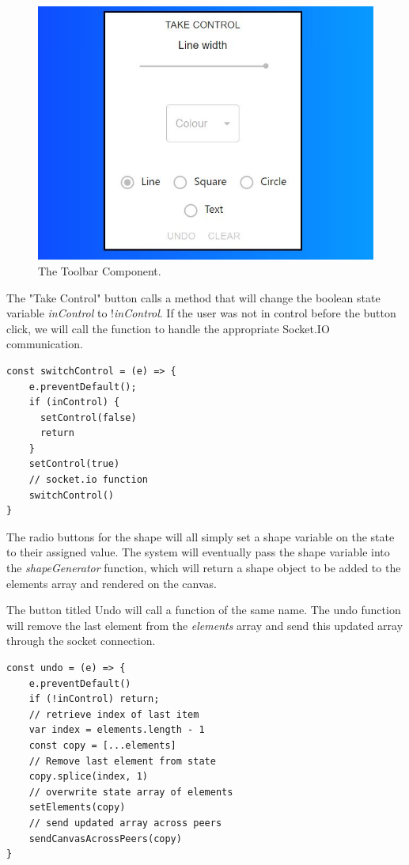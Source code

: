 \begin{figure}[H]
    \centering
    \includegraphics[scale=0.6]{img/SystemDesign/Canvas/toolbar-screenshot.JPG}
    \caption{The Toolbar Component.}
\end{figure}

The "Take Control" button calls a method that will change the boolean state variable \textit{inControl} to !\textit{inControl}. If the user was not in control before the button click, we will call the function to handle the appropriate Socket.IO communication.  
\begin{verbatim}
const switchControl = (e) => {
    e.preventDefault();
    if (inControl) {
      setControl(false)
      return
    }
    setControl(true)
    // socket.io function
    switchControl() 
}
\end{verbatim}

The radio buttons for the shape will all simply set a shape variable on the state to their assigned value. The system will eventually pass the shape variable into the \textit{shapeGenerator} function, which will return a shape object to be added to the elements array and rendered on the canvas.

The button titled Undo will call a function of the same name. The undo function will remove the last element from the \textit{elements} array and send this updated array through the socket connection. 

\begin{verbatim}
const undo = (e) => {
    e.preventDefault()
    if (!inControl) return;
    // retrieve index of last item
    var index = elements.length - 1
    const copy = [...elements]
    // Remove last element from state
    copy.splice(index, 1)
    // overwrite state array of elements
    setElements(copy)
    // send updated array across peers 
    sendCanvasAcrossPeers(copy)
}
\end{verbatim}

